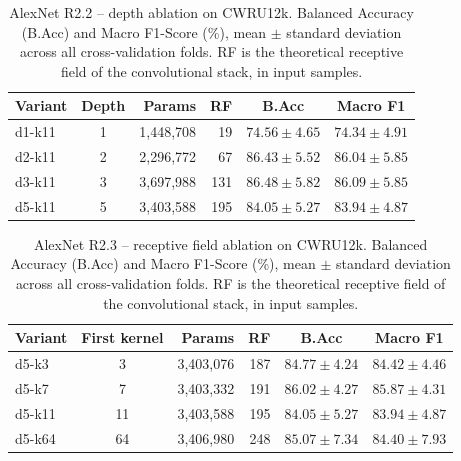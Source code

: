 \begin{table}[ht]
\centering
\caption{AlexNet R2.2 -- depth ablation on CWRU12k. Balanced Accuracy (B.Acc) and Macro F1-Score (\%), mean $\pm$ standard deviation across all cross-validation folds. RF is the theoretical receptive field of the convolutional stack, in input samples.}
\label{tab:ablation_alexnet_depth_cwru12k}
\begin{tabular}{@{}l c r r c c@{}}
\toprule
\textbf{Variant} & \textbf{Depth} & \textbf{Params} & \textbf{RF} & \textbf{B.Acc} & \textbf{Macro F1} \\ \midrule
d1-k11 & 1 & 1,448,708 & 19 & $74.56 \pm 4.65$ & $74.34 \pm 4.91$ \\
d2-k11 & 2 & 2,296,772 & 67 & $86.43 \pm 5.52$ & $86.04 \pm 5.85$ \\
d3-k11 & 3 & 3,697,988 & 131 & $86.48 \pm 5.82$ & $86.09 \pm 5.85$ \\
d5-k11 & 5 & 3,403,588 & 195 & $84.05 \pm 5.27$ & $83.94 \pm 4.87$ \\
\bottomrule
\end{tabular}
\end{table}

\begin{table}[ht]
\centering
\caption{AlexNet R2.3 -- receptive field ablation on CWRU12k. Balanced Accuracy (B.Acc) and Macro F1-Score (\%), mean $\pm$ standard deviation across all cross-validation folds. RF is the theoretical receptive field of the convolutional stack, in input samples.}
\label{tab:ablation_alexnet_kernel_cwru12k}
\begin{tabular}{@{}l c r r c c@{}}
\toprule
\textbf{Variant} & \textbf{First kernel} & \textbf{Params} & \textbf{RF} & \textbf{B.Acc} & \textbf{Macro F1} \\ \midrule
d5-k3 & 3 & 3,403,076 & 187 & $84.77 \pm 4.24$ & $84.42 \pm 4.46$ \\
d5-k7 & 7 & 3,403,332 & 191 & $86.02 \pm 4.27$ & $85.87 \pm 4.31$ \\
d5-k11 & 11 & 3,403,588 & 195 & $84.05 \pm 5.27$ & $83.94 \pm 4.87$ \\
d5-k64 & 64 & 3,406,980 & 248 & $85.07 \pm 7.34$ & $84.40 \pm 7.93$ \\
\bottomrule
\end{tabular}
\end{table}

